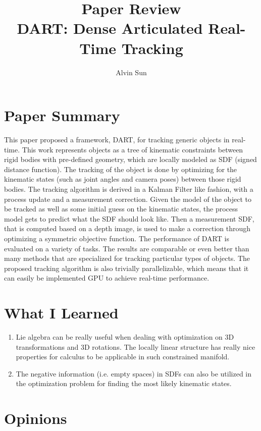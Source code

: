 \documentclass[10pt, twocolumn]{article}
\title{\vspace{-3.0em}Paper Review\\DART: Dense Articulated Real-Time Tracking}
\author{Alvin Sun}
\begin{document}
\maketitle

\section{Paper Summary}
This paper proposed a framework, DART, for tracking generic objects in
real-time. This work represents objects as a tree of kinematic constraints between
rigid bodies with pre-defined geometry, which are locally modeled as SDF (signed
distance function). The tracking of the object is done by optimizing for
the kinematic states (such as joint angles and camera poses) between those
rigid bodies.
The tracking algorithm is derived in a Kalman Filter like
fashion, with a process update and a measurement correction. Given the model
of the object to be tracked as well as some initial guess on the kinematic
states, the process model gets to predict what the SDF should look like. Then
a measurement SDF, that is computed based on a depth image, is used to make a
correction through optimizing a symmetric objective function.
The performance of DART is evaluated on a
variety of tasks. The results are comparable or even better than many methods
that are specialized for tracking particular types of objects. The proposed
tracking algorithm is also trivially parallelizable, which means that it can easily
be implemented GPU to achieve real-time performance.

\section{What I Learned}
\begin{enumerate}
  \item Lie algebra can be really useful when dealing with optimization
    on 3D transformations and 3D rotations. The locally linear structure
    has really nice properties for calculus to be applicable in such
    constrained manifold.

  \item The negative information (i.e. empty spaces) in SDFs can also be
    utilized in the optimization problem for finding the most likely
    kinematic states.
\end{enumerate}

\section{Opinions}
\end{document}

